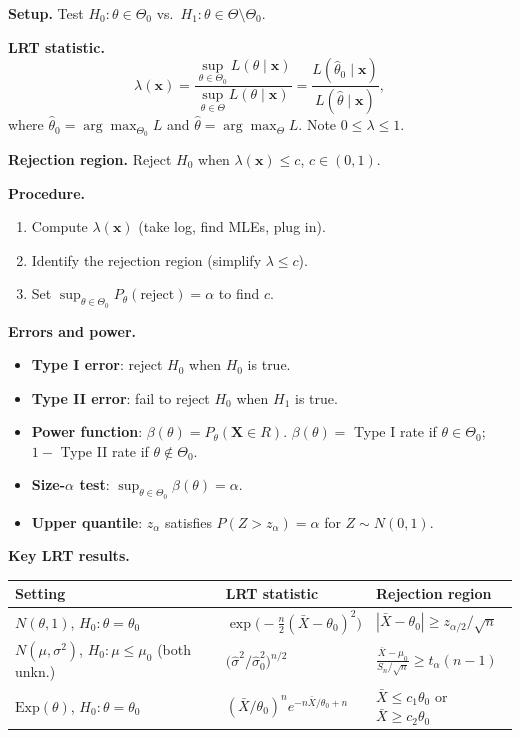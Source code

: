 \documentclass[11pt]{article}
\begin{document}
\textbf{Setup.} Test $H_0:\theta\in\Theta_0$
vs.\ $H_1:\theta\in\Theta\setminus\Theta_0$.

\medskip
\textbf{LRT statistic.}
\[
  \lambda(\mathbf{x}) =
  \frac{\sup_{\theta\in\Theta_0}L(\theta\mid\mathbf{x})}{\sup_{\theta\in\Theta}L(\theta\mid\mathbf{x})}
  = \frac{L(\hat\theta_0\mid\mathbf{x})}{L(\hat\theta\mid\mathbf{x})},
\]
where $\hat\theta_0=\arg\max_{\Theta_0} L$ and $\hat\theta=\arg\max_\Theta L$.
Note $0\leq\lambda\leq 1$.

\textbf{Rejection region.} Reject $H_0$ when $\lambda(\mathbf{x})\leq
c$, $c\in(0,1)$.

\medskip
\textbf{Procedure.}
\begin{enumerate}
  \item Compute $\lambda(\mathbf{x})$ (take log, find MLEs, plug in).
  \item Identify the rejection region (simplify $\lambda\leq c$).
  \item Set $\sup_{\theta\in\Theta_0}P_\theta(\text{reject})=\alpha$
    to find $c$.
\end{enumerate}

\medskip
\noindent\textbf{Errors and power.}
\begin{itemize}
  \item \textbf{Type I error}: reject $H_0$ when $H_0$ is true.
  \item \textbf{Type II error}: fail to reject $H_0$ when $H_1$ is true.
  \item \textbf{Power function}: $\beta(\theta)=P_\theta(\mathbf{X}\in R)$.
    \quad $\beta(\theta)=$ Type I rate if $\theta\in\Theta_0$; $1-$
    Type II rate if $\theta\notin\Theta_0$.
  \item \textbf{Size-$\alpha$ test}:
    $\sup_{\theta\in\Theta_0}\beta(\theta)=\alpha$.
  \item \textbf{Upper quantile}: $z_\alpha$ satisfies
    $P(Z>z_\alpha)=\alpha$ for $Z\sim N(0,1)$.
\end{itemize}

\medskip
\noindent\textbf{Key LRT results.}

\begin{tabular}{lll}
  \toprule
  Setting & LRT statistic & Rejection region \\
  \midrule
  $N(\theta,1)$, $H_0:\theta=\theta_0$ & $\exp\bigl(-\frac{n}{2}(\bar
  X-\theta_0)^2\bigr)$ & $|\bar X-\theta_0|\geq z_{\alpha/2}/\sqrt{n}$ \\[4pt]
  $N(\mu,\sigma^2)$, $H_0:\mu\leq\mu_0$ (both unkn.) &
  $\bigl(\hat\sigma^2/\hat\sigma_0^2\bigr)^{n/2}$ & $\frac{\bar
  X-\mu_0}{S_n/\sqrt{n}}\geq t_\alpha(n-1)$ \\[4pt]
  $\mathrm{Exp}(\theta)$, $H_0:\theta=\theta_0$ & $(\bar
  X/\theta_0)^n e^{-n\bar X/\theta_0+n}$ & $\bar X\leq c_1\theta_0$
  or $\bar X\geq c_2\theta_0$ \\
  \bottomrule
\end{tabular}
\end{document}
